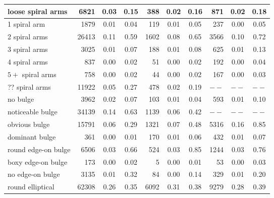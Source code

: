 \documentclass[iop,apj,tighten]{emulateapj}
\begin{document}
\begin{table*}
\begin{tabular}{l|rcc|rcc|rcc}
    loose spiral arms       &   6821 & 0.03    & 0.15    &    388 & 0.02    & 0.16    &   871 & 0.02    & 0.18 \\
    \hline                                                                            
    1 spiral arm            &   1879 & 0.01    & 0.04    &    119 & 0.01    & 0.05    &   237 & 0.00    & 0.05 \\
    2 spiral arms           &  26413 & 0.11    & 0.59    &   1602 & 0.08    & 0.65    &  3566 & 0.10    & 0.72 \\
    3 spiral arms           &   3025 & 0.01    & 0.07    &    188 & 0.01    & 0.08    &   625 & 0.01    & 0.13 \\
    4 spiral arms           &    837 & 0.00    & 0.02    &     51 & 0.00    & 0.02    &   192 & 0.00    & 0.04 \\
    $5+$ spiral arms        &    758 & 0.00    & 0.02    &     44 & 0.00    & 0.02    &   167 & 0.00    & 0.03 \\
    ?? spiral arms          &  11922 & 0.05    & 0.27    &    478 & 0.02    & 0.19    &  $--$ & $--$    & $--$ \\
    \hline                                                                            
    no bulge                &   3962 & 0.02    & 0.07    &    103 & 0.01    & 0.04    &   593 & 0.01    & 0.10 \\
    noticeable bulge        &  34139 & 0.14    & 0.63    &   1139 & 0.06    & 0.42    &  $--$ & $--$    & $--$ \\
    obvious bulge           &  15791 & 0.06    & 0.29    &   1321 & 0.07    & 0.48    &  5316 & 0.16    & 0.85 \\
    dominant bulge          &    361 & 0.00    & 0.01    &    170 & 0.01    & 0.06    &   432 & 0.01    & 0.07 \\
    \hline                                                                      
    round edge-on bulge     &   6506 & 0.03    & 0.66    &    524 & 0.03    & 0.85    &  1244 & 0.03    & 0.76 \\
    boxy edge-on bulge      &    173 & 0.00    & 0.02    &      5 & 0.00    & 0.01    &    53 & 0.00    & 0.03 \\
    no edge-on bulge        &   3135 & 0.01    & 0.32    &     84 & 0.00    & 0.14    &   329 & 0.01    & 0.20 \\
    \hline                                                                   
    round elliptical        &  62308 & 0.26    & 0.35    &   6092 & 0.31    & 0.38    &  9279 & 0.28    & 0.39 \\

\end{tabular}
\end{table*}
\end{document}
